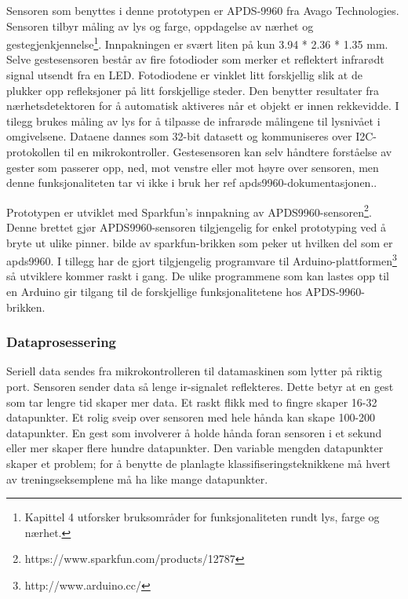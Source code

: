 Sensoren som benyttes i denne prototypen er APDS-9960 fra Avago Technologies. Sensoren tilbyr måling av lys og farge, oppdagelse av nærhet og gestegjenkjennelse\footnote{Kapittel 4 utforsker bruksområder for funksjonaliteten rundt lys, farge og nærhet.}. Innpakningen er svært liten på kun 3.94 * 2.36 * 1.35 mm. Selve gestesensoren består av fire fotodioder som merker et reflektert infrarødt signal utsendt fra en LED. Fotodiodene er vinklet litt forskjellig slik at de plukker opp refleksjoner på litt forskjellige steder. Den benytter resultater fra nærhetsdetektoren for å automatisk aktiveres når et objekt er innen rekkevidde. I tilegg brukes måling av lys for å tilpasse de infrarøde målingene til lysnivået i omgivelsene. Dataene dannes som 32-bit datasett og kommuniseres over I2C-protokollen til en mikrokontroller. Gestesensoren kan selv håndtere forståelse av gester som passerer opp, ned, mot venstre eller mot høyre over sensoren, men denne funksjonaliteten tar vi ikke i bruk her {\color{red} ref apds9960-dokumentasjonen.}.

Prototypen er utviklet med Sparkfun's innpakning av APDS9960-sensoren\footnote{https://www.sparkfun.com/products/12787}. Denne brettet gjør APDS9960-sensoren tilgjengelig for enkel prototyping ved å bryte ut ulike pinner. {\color{red} bilde av sparkfun-brikken som peker ut hvilken del som er apds9960.} I tillegg har de gjort tilgjengelig programvare til Arduino-plattformen\footnote{http://www.arduino.cc/} så utviklere kommer raskt i gang. De ulike programmene som kan lastes opp til en Arduino gir tilgang til de forskjellige funksjonalitetene hos APDS-9960-brikken.

\subsubsection*{Dataprosessering}
Seriell data sendes fra mikrokontrolleren til datamaskinen som lytter på riktig port. Sensoren sender data så lenge ir-signalet reflekteres. Dette betyr at en gest som tar lengre tid skaper mer data. Et raskt flikk med to fingre skaper 16-32 datapunkter. Et rolig sveip over sensoren med hele hånda kan skape 100-200 datapunkter. En gest som involverer å holde hånda foran sensoren i et sekund eller mer skaper flere hundre datapunkter. Den variable mengden datapunkter skaper et problem; for å benytte de planlagte klassifiseringsteknikkene må hvert av treningseksemplene må ha like mange datapunkter.

